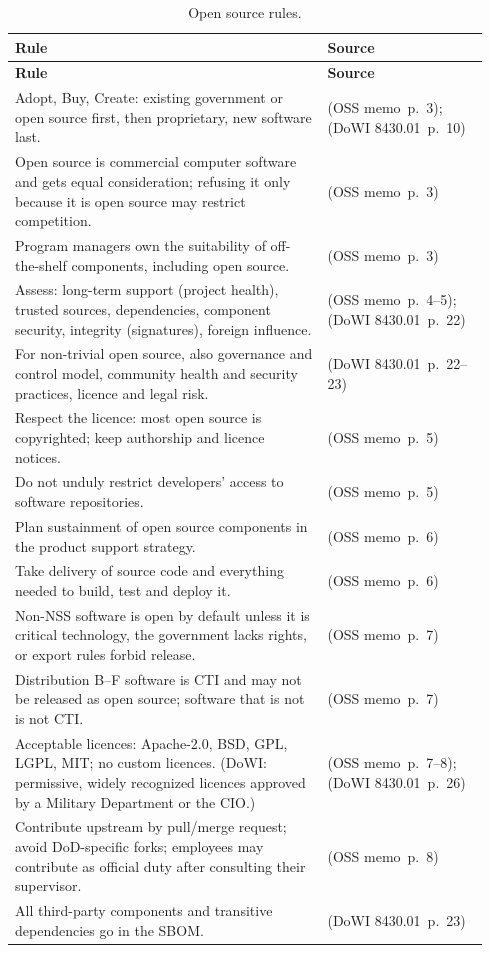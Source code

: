 \documentclass[11pt,letterpaper,twoside,openany]{memoir}
\newcommand{\pg}[2]{{\small(#1~p.~#2)}}          %
\begin{document}
\begin{longtable}{@{}L{0.62\linewidth}L{0.32\linewidth}@{}}
\caption{Open source rules.}\label{tab:oss}\\
\toprule \sffamily\bfseries Rule & \sffamily\bfseries Source\\ \midrule\endfirsthead
\toprule \sffamily\bfseries Rule & \sffamily\bfseries Source\\ \midrule\endhead
\bottomrule\endfoot
Adopt, Buy, Create: existing government or open source first, then proprietary, new software last. & \pg{OSS memo}{3}; \pg{DoWI 8430.01}{10}\\
Open source is commercial computer software and gets equal consideration; refusing it only because it is open source may restrict competition. & \pg{OSS memo}{3}\\
Program managers own the suitability of off-the-shelf components, including open source. & \pg{OSS memo}{3}\\
Assess: long-term support (project health), trusted sources, dependencies, component security, integrity (signatures), foreign influence. & \pg{OSS memo}{4--5}; \pg{DoWI 8430.01}{22}\\
For non-trivial open source, also governance and control model, community health and security practices, licence and legal risk. & \pg{DoWI 8430.01}{22--23}\\
Respect the licence: most open source is copyrighted; keep authorship and licence notices. & \pg{OSS memo}{5}\\
Do not unduly restrict developers' access to software repositories. & \pg{OSS memo}{5}\\
Plan sustainment of open source components in the product support strategy. & \pg{OSS memo}{6}\\
Take delivery of source code and everything needed to build, test and deploy it. & \pg{OSS memo}{6}\\
Non-NSS software is open by default unless it is critical technology, the government lacks rights, or export rules forbid release. & \pg{OSS memo}{7}\\
Distribution B--F software is CTI and may not be released as open source; software that is not is not CTI. & \pg{OSS memo}{7}\\
Acceptable licences: Apache-2.0, BSD, GPL, LGPL, MIT; no custom licences. (DoWI: permissive, widely recognized licences approved by a Military Department or the CIO.) & \pg{OSS memo}{7--8}; \pg{DoWI 8430.01}{26}\\
Contribute upstream by pull/merge request; avoid DoD-specific forks; employees may contribute as official duty after consulting their supervisor. & \pg{OSS memo}{8}\\
All third-party components and transitive dependencies go in the SBOM. & \pg{DoWI 8430.01}{23}\\
\end{longtable}
\end{document}
